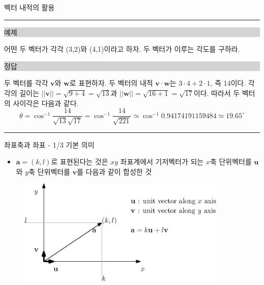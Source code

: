 \begin{frame}{벡터 내적의 활용}
\hrule

\noindent \colorbox{lightgray}{\begin{minipage}{6cm}예제\end{minipage}} 


\noindent 어떤 두 벡터가 각각 (3,2)와 (4,1)이라고 하자. 두 벡터가 이루는 각도를 구하라.

\noindent \colorbox{lightgray}{\begin{minipage}{6cm}정답\end{minipage}} 

\noindent 두 벡터를 각각 $\mathbf v$와 $\mathbf w$로 표현하자. 두 벡터의 내적 $\mathbf v \cdot \mathbf w$는 $3 \cdot 4 + 2 \cdot 1$, 즉 14이다.
각각의 길이는 $||\mathbf v|| = \sqrt{9+4} = \sqrt{13}$과 $||\mathbf w|| = \sqrt{16+1} = \sqrt{17}$이다.
따라서 두 벡터의 사이각은 다음과 같다.
$$\theta = \cos^{-1} \frac{14}{\sqrt{13} \sqrt{17}} = \cos^{-1} \frac{14}{\sqrt{221}} \simeq \cos^{-1} 0.94174191159484 \simeq 19.65 ^{\circ}$$

\hrule

\end{frame}


\begin{frame}{좌표축과 좌표 - 1/3 기본 의미}

\begin{itemize}
\item $\mathbf a  = (k, l)$로 표현된다는 것은 $xy$ 좌표계에서 기저벡터가 되는
$x$축 단위벡터를 $\mathbf u$와 $y$축 단위벡터를 $\mathbf v$를 다음과 같이 합성한 것
\end{itemize}

\begin{figure}
\includegraphics[width=10cm]{Math_vector/vectorComponents.eps}
\end{figure}

\end{frame}


